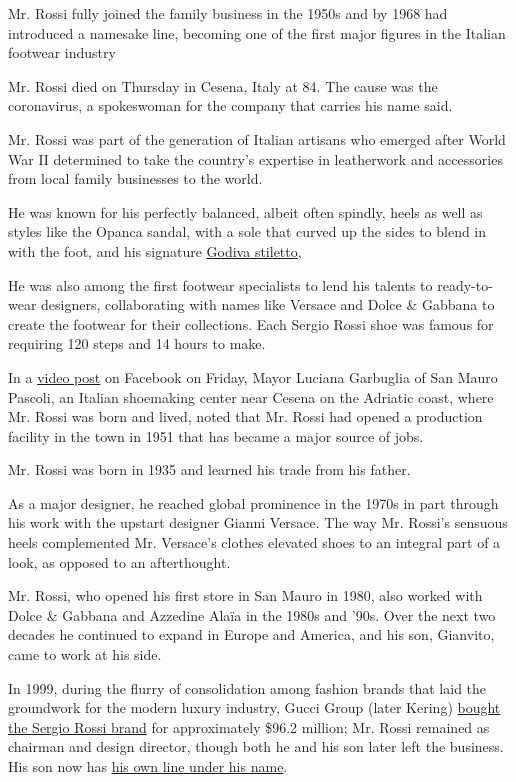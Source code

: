 Mr. Rossi fully joined the family business in the 1950s and by 1968 had
introduced a namesake line, becoming one of the first major figures in
the Italian footwear industry

Mr. Rossi died on Thursday in Cesena, Italy at 84. The cause was the
coronavirus, a spokeswoman for the company that carries his name said.

Mr. Rossi was part of the generation of Italian artisans who emerged
after World War II determined to take the country's expertise in
leatherwork and accessories from local family businesses to the world.

He was known for his perfectly balanced, albeit often spindly, heels as
well as styles like the Opanca sandal, with a sole that curved up the
sides to blend in with the foot, and his signature
\href{https://www.farfetch.com/shopping/women/sergio-rossi-godiva-stiletto-pumps-item-12546784.aspx}{Godiva
stiletto},

He was also among the first footwear specialists to lend his talents to
ready-to-wear designers, collaborating with names like Versace and Dolce
\& Gabbana to create the footwear for their collections. Each Sergio
Rossi shoe was famous for requiring 120 steps and 14 hours to make.

In a
\href{https://www.facebookcorewwwi.onion/lucianagarbugliasindaco/videos/1111139359247799/?q=Luciana\%20Garbuglia}{video
post} on Facebook on Friday, Mayor Luciana Garbuglia of San Mauro
Pascoli, an Italian shoemaking center near Cesena on the Adriatic coast,
where Mr. Rossi was born and lived, noted that Mr. Rossi had opened a
production facility in the town in 1951 that has became a major source
of jobs.

Mr. Rossi was born in 1935 and learned his trade from his father.

As a major designer, he reached global prominence in the 1970s in part
through his work with the upstart designer Gianni Versace. The way Mr.
Rossi's sensuous heels complemented Mr. Versace's clothes elevated shoes
to an integral part of a look, as opposed to an afterthought.

Mr. Rossi, who opened his first store in San Mauro in 1980, also worked
with Dolce \& Gabbana and Azzedine Alaïa in the 1980s and '90s. Over the
next two decades he continued to expand in Europe and America, and his
son, Gianvito, came to work at his side.

In 1999, during the flurry of consolidation among fashion brands that
laid the groundwork for the modern luxury industry, Gucci Group (later
Kering) \href{https://www.wsj.com/articles/SB942941056103661531}{bought
the Sergio Rossi brand} for approximately \$96.2 million; Mr. Rossi
remained as chairman and design director, though both he and his son
later left the business. His son now has
\href{https://www.gianvitorossi.com/us_en/}{his own line under his
name}.

